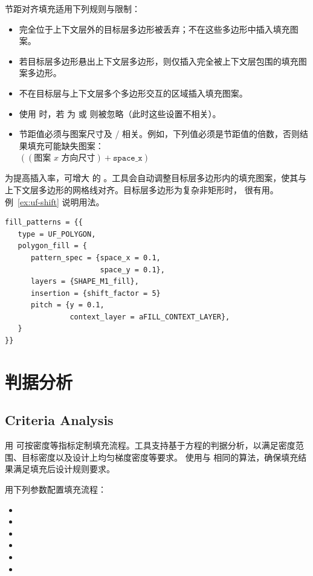 节距对齐填充适用下列规则与限制：
\begin{itemize}
  \item 完全位于上下文层外的目标层多边形被丢弃；不在这些多边形中插入填充图案。
  \item 若目标层多边形悬出上下文层多边形，则仅插入完全被上下文层包围的填充图案多边形。
  \item 不在目标层与上下文层多个多边形交互的区域插入填充图案。
  \item 使用  时，若  为  或  则被忽略（此时这些设置不相关）。
  \item 节距值必须与图案尺寸及 / 相关。例如，下列值必须是节距值的倍数，否则结果填充可能缺失图案：\\
  $((\text{图案 }x\text{ 方向尺寸}) + \texttt{space\_x})$
\end{itemize}

为提高插入率，可增大  的 。工具会自动调整目标层多边形内的填充图案，使其与上下文层多边形的网格线对齐。目标层多边形为复杂非矩形时， 很有用。例~\ref{ex:uf-shift} 说明用法。

\begin{lstlisting}[style=pxl,caption={使用 shift\_factor 选项},label={ex:uf-shift}]
fill_patterns = {{
   type = UF_POLYGON,
   polygon_fill = {
      pattern_spec = {space_x = 0.1,
                      space_y = 0.1},
      layers = {SHAPE_M1_fill},
      insertion = {shift_factor = 5}
      pitch = {y = 0.1,
               context_layer = aFILL_CONTEXT_LAYER},
   }
}}
\end{lstlisting}

\section{判据分析}
\subsection*{Criteria Analysis}

用  可按密度等指标定制填充流程。工具支持基于方程的判据分析，以满足密度范围、目标密度以及设计上均匀梯度密度等要求。 使用与  相同的算法，确保填充结果满足填充后设计规则要求。

用下列参数配置填充流程：
\begin{itemize}
  \item {}
  \item {}
  \item {}
  \item {}
  \item {}
  \item {}
\end{itemize}

